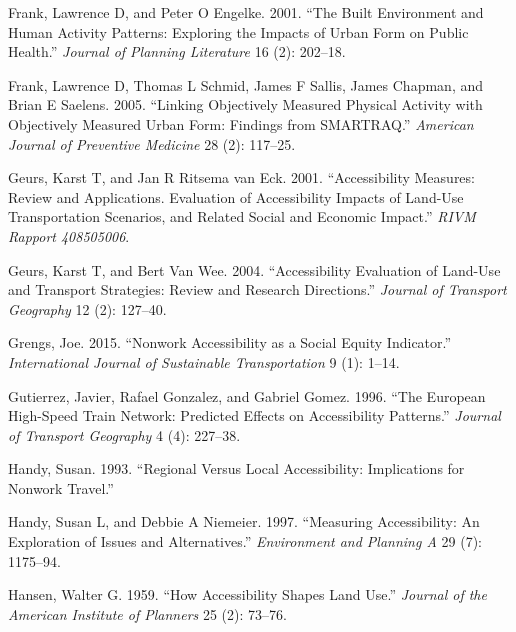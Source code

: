 \documentclass[preprint, 3p,
authoryear]{elsarticle} %
\newlength{\cslhangindent}
\newlength{\cslentryspacingunit} %
\newenvironment{CSLReferences}[2] %
 {%
  \setlength{\parindent}{0pt}
  \ifodd #1
  \let\oldpar\par
  \def\par{\hangindent=\cslhangindent\oldpar}
  \fi
  \setlength{\parskip}{#2\cslentryspacingunit}
 }%
 {}
\begin{document}
\begin{CSLReferences}{1}{0}
\leavevmode{}%
Frank, Lawrence D, and Peter O Engelke. 2001. {``The Built Environment
and Human Activity Patterns: Exploring the Impacts of Urban Form on
Public Health.''} \emph{Journal of Planning Literature} 16 (2): 202--18.

\leavevmode{}%
Frank, Lawrence D, Thomas L Schmid, James F Sallis, James Chapman, and
Brian E Saelens. 2005. {``Linking Objectively Measured Physical Activity
with Objectively Measured Urban Form: Findings from SMARTRAQ.''}
\emph{American Journal of Preventive Medicine} 28 (2): 117--25.

\leavevmode{}%
Geurs, Karst T, and Jan R Ritsema van Eck. 2001. {``Accessibility
Measures: Review and Applications. Evaluation of Accessibility Impacts
of Land-Use Transportation Scenarios, and Related Social and Economic
Impact.''} \emph{RIVM Rapport 408505006}.

\leavevmode{}%
Geurs, Karst T, and Bert Van Wee. 2004. {``Accessibility Evaluation of
Land-Use and Transport Strategies: Review and Research Directions.''}
\emph{Journal of Transport Geography} 12 (2): 127--40.

\leavevmode{}%
Grengs, Joe. 2015. {``Nonwork Accessibility as a Social Equity
Indicator.''} \emph{International Journal of Sustainable Transportation}
9 (1): 1--14.

\leavevmode{}%
Gutierrez, Javier, Rafael Gonzalez, and Gabriel Gomez. 1996. {``The
European High-Speed Train Network: Predicted Effects on Accessibility
Patterns.''} \emph{Journal of Transport Geography} 4 (4): 227--38.

\leavevmode{}%
Handy, Susan. 1993. {``Regional Versus Local Accessibility: Implications
for Nonwork Travel.''}

\leavevmode{}%
Handy, Susan L, and Debbie A Niemeier. 1997. {``Measuring Accessibility:
An Exploration of Issues and Alternatives.''} \emph{Environment and
Planning A} 29 (7): 1175--94.

\leavevmode{}%
Hansen, Walter G. 1959. {``How Accessibility Shapes Land Use.''}
\emph{Journal of the American Institute of Planners} 25 (2): 73--76.


\end{CSLReferences}
\end{document}
